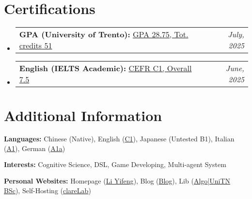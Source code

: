 \documentclass[a4paper,11pt]{article}
\makeatletter
\newcommand{\resumePOR}[3]{
	\vspace{0.5mm}\item
	\begin{tabular*}{0.97\textwidth}[t]{l@{\extracolsep{\fill}}r}
		\textbf{#1}\hspace{0.3mm}#2 & \textit{\small{#3}} 
	\end{tabular*}
	\vspace{-2mm}
}
\newcommand{\resumeSubHeadingListStart}{\begin{itemize}[leftmargin=*,labelsep=1mm]}
\newcommand{\resumeSubHeadingListEnd}{\end{itemize}\vspace{2mm}}
\makeatother
\begin{document}
	\section{\textbf{Certifications}}
	\vspace{-0.2mm}
	\resumeSubHeadingListStart
	\resumePOR{}{
		\textbf{GPA (University of Trento):}
			{{\href{https://yifen9.li/gpa/bsc_unitn.pdf}{GPA 28.75, Tot. credits 51}}}}
		{July, 2025}
	\resumePOR{}{
		\textbf{English (IELTS Academic):}
			{{\href{https://yifen9.li/lang/en_ielts.pdf}{CEFR C1, Overall 7.5}}}}
		{June, 2025}
	\resumeSubHeadingListEnd
	\vspace{-6mm}
	
	\section{\textbf{Additional Information}}
	\vspace{-0.4mm}
	\small{
		\textbf{Languages:}
			Chinese
				(Native),
			English
				({\href{https://yifen9.li/lang/en_ielts.pdf}{C1}}),
			Japanese
				(Untested B1),
			Italian
				({\href{https://yifen9.li/lang/it_unitn.png}{A1}}),
			German
				({\href{https://yifen9.li/lang/de_unitn.png}{A1a}})
		
		\textbf{Interests:}
			Cognitive Science,
			DSL,
			Game Developing,
			Multi-agent System
		
		\textbf{Personal Websites:}
			Homepage
				({\href{https://yifen9.li}{Li Yifeng}}),
			Blog
				({\href{https://blog.yifen9.li}{Blog}}),
			Lib
				({\href{https://algo.yifen9.li}{Algo}}|{\href{https://unitn.yifen9.li}{UniTN BSc}}),
			Self-Hosting
				({\href{https://clarelab.moe}{clareLab}})
	}
	\vspace{-4mm}
	
\end{document}
